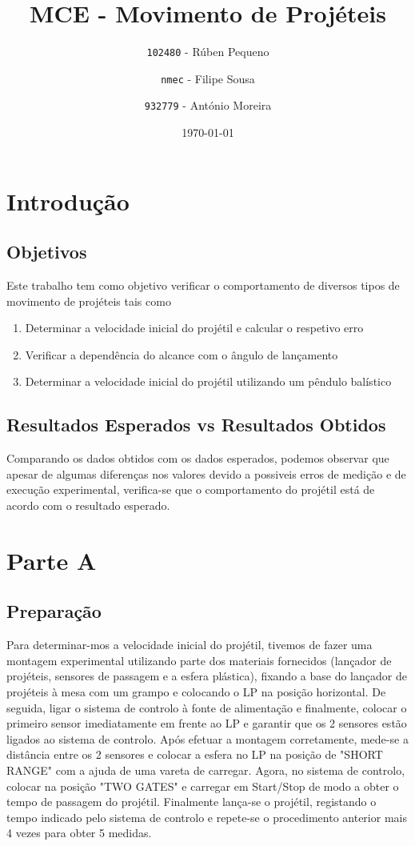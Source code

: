 \documentclass{report}
\title{MCE - Movimento de Projéteis}
\author{\texttt{102480} - Rúben Pequeno
\and 
\texttt{nmec} - Filipe Sousa
\and
\texttt{932779} - António Moreira}
\date{\today}
\begin{document}
\maketitle

\tableofcontents
\newpage

\chapter{Introdução}

\section{Objetivos}
	Este trabalho tem como objetivo verificar o comportamento de diversos tipos de movimento de projéteis tais como 
	\renewcommand{\theenumi}{\Alph{enumi}}
	\begin{enumerate}
		\item{Determinar a velocidade inicial do projétil e calcular o respetivo erro}
		\item{Verificar a dependência do alcance com o ângulo de lançamento}
		\item{Determinar a velocidade inicial do projétil utilizando um pêndulo balístico}
	\end{enumerate}


\section{Resultados Esperados vs Resultados Obtidos}
	Comparando os dados obtidos com os dados esperados, podemos observar que apesar de algumas
	diferenças nos valores devido a possiveis erros de medição e de execução experimental, verifica-se
	que o comportamento do projétil está de acordo com o resultado esperado.
	

\chapter{Parte A}

\section{Preparação}
	Para determinar-mos a velocidade inicial do projétil, tivemos de fazer uma montagem experimental
	 utilizando parte dos materiais fornecidos (lançador de projéteis, sensores de passagem e a esfera plástica),
	 fixando a base do lançador de projéteis à mesa com um grampo e colocando o LP na posição horizontal. De seguida, 
	 ligar o sistema de controlo à fonte de alimentação e finalmente, colocar o primeiro sensor imediatamente 
	 em frente ao LP e garantir que os 2 sensores estão ligados ao sistema de controlo.
	 Após efetuar a montagem corretamente, mede-se a distância entre os 2 sensores e colocar a 
	 esfera no LP na posição de "SHORT RANGE" com a ajuda de uma vareta de carregar.
	 Agora, no sistema de controlo, colocar na posição "TWO GATES" e carregar em Start/Stop 
	 de modo a obter o tempo de passagem do projétil. Finalmente lança-se o projétil, registando 
	 o tempo indicado pelo sistema de controlo e repete-se o procedimento anterior mais 4 vezes para obter 
	 5 medidas.
\end{document}
